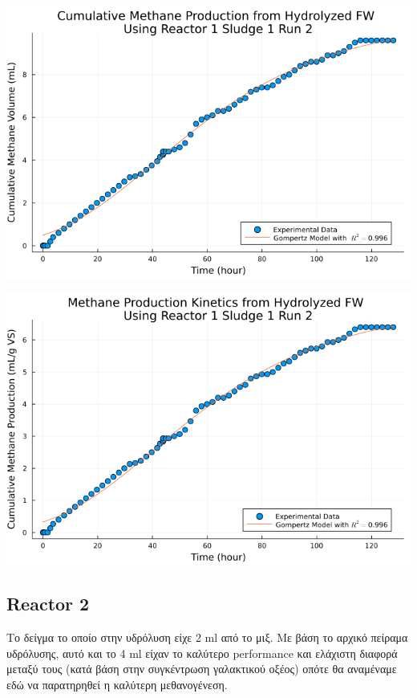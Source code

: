 \documentclass[11pt]{article}
\begin{document}
\begin{center}
\includegraphics[width=.9\linewidth]{../plots/BMPs/Hydrolyzed FW/methane_kinetics_hydrolysate_1_s1_r2_hour.png}
\end{center}

\begin{center}
\includegraphics[width=.9\linewidth]{../plots/BMPs/Hydrolyzed FW/specific_methane_kinetics_hydrolysate_1_s1_r2_hour.png}
\end{center}

\subsection{Reactor 2}
\label{sec:orgaf86fe2}
Το δείγμα το οποίο στην υδρόλυση είχε 2 ml από το μιξ. Με βάση το αρχικό πείραμα υδρόλυσης, αυτό και το 4 ml είχαν το καλύτερο performance και ελάχιστη διαφορά μεταξύ τους (κατά βάση στην συγκέντρωση γαλακτικού οξέος) οπότε θα αναμέναμε εδώ να παρατηρηθεί η καλύτερη μεθανογένεση.
\end{document}
